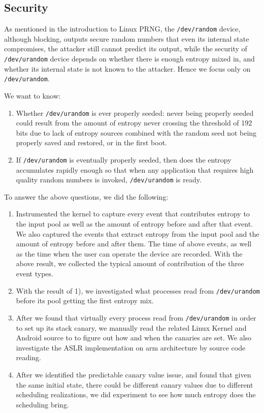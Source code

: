 \subsection{Security}

As mentioned in the introduction to Linux PRNG, the \verb|/dev/random| device, although blocking, outputs secure random numbers that even its internal state compromises, the attacker still cannot predict its output, while the security of \verb|/dev/urandom| device depends on whether there is enough entropy mixed in, and whether its internal state is not known to the attacker. Hence we focus only on \verb|/dev/urandom|.


We want to know:

\begin{enumerate}
\item Whether \verb|/dev/urandom| is ever properly seeded: never being properly seeded could result from the amount of entropy never crossing the threshold of 192 bits due to lack of entropy sources combined with the random seed not being properly saved and restored, or in the first boot.

\item If \verb|/dev/urandom| is eventually properly seeded, then does the entropy accumulates rapidly enough so that when any application that requires high quality random numbers is invoked, \verb|/dev/urandom| is ready.

\end{enumerate}

To answer the above questions, we did the following:
\begin{enumerate}
\item Instrumented the kernel to capture every event that contributes entropy to the input pool as well as the amount of entropy before and after that event. We also captured the events that extract entropy from the input pool and the amount of entropy before and after them. The time of above events, as well as the time when the user can operate the device are recorded. With the above result, we collected the typical amount of contribution of the three event types.

\item With the result of 1), we investigated what processes read from \verb|/dev/urandom| before its pool getting the first entropy mix.

\item After we found that virtually every process read from \verb|/dev/urandom| in order to set up its stack canary, we manually read the related Linux Kernel and Android source to to figure out how and when the canaries are set. We also investigate the ASLR implementation on arm architecture by source code reading.

\item After we identified the predictable canary value issue, and found that given the same initial state, there could be different canary values due to different scheduling realizations, we did experiment to see how much entropy does the scheduling bring.

\end{enumerate}




